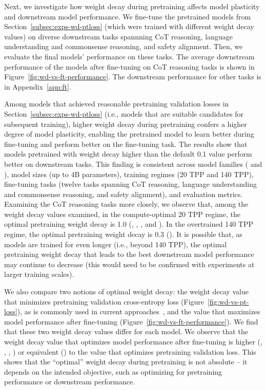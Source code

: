 Next, we investigate how weight decay during pretraining affects model plasticity and downstream model performance.
We fine-tune the pretrained models from Section~\ref{subsec:exps-wd-ptloss} (which were trained with different weight decay values) on diverse downstream tasks spannning CoT reasoning, language understanding and commonsense reasoning, and safety alignment. Then, we evaluate the final models' performance on these tasks. 
The average downstream performance of the models after fine-tuning on CoT reasoning tasks is shown in Figure~\ref{fig:wd-vs-ft-performance}.
The downstream performance for other tasks is in Appendix~\ref{app:ft}.

Among models that achieved reasonable pretraining validation losses in Section~\ref{subsec:exps-wd-ptloss} (i.e., models that are suitable candidates for subsequent training), higher weight decay during pretraining confers a higher degree of model plasticity, enabling the pretrained model to learn better during fine-tuning and perform better on the fine-tuning task.
The results show that models pretrained with weight decay higher than the default 0.1 value perform better on downstream tasks. This finding is consistent across model families (\llama{} and \olmo{}), model sizes (up to 4B parameters), training regimes (20 TPP and 140 TPP), fine-tuning tasks (twelve tasks spanning CoT reasoning, language understanding and commonsense reasoning, and safety alignment), and evaluation metrics.
Examining the CoT reasoning tasks more closely, we observe that, among the weight decay values examined, in the compute-optimal 20 TPP regime, the optimal pretraining weight decay is 1.0 (\llamazeropointfiveB{}, \llamaoneB{}, \llamafourB{}, and \olmoonex{}). In the overtrained 140 TPP regime, the optimal pretraining weight decay is 0.3 (\olmosevenx{}). It is possible that, as models are trained for even longer (i.e., beyond 140 TPP), the optimal pretraining weight decay that leads to the best downstream model performance may continue to decrease (this would need to be confirmed with experiments at larger training scales). 




We also compare two notions of optimal weight decay: the weight decay value that minimizes pretraining validation cross-entropy loss (Figure~\ref{fig:wd-vs-pt-loss}), as is commonly used in current approaches~\citep{bergsma2505powerlines}, and the value that maximizes model performance after fine-tuning (Figure~\ref{fig:wd-vs-ft-performance}). We find that these two weight decay values differ for each model. We observe that the weight decay value that optimizes model performance after fine-tuning is higher (\llamazeropointfiveB{}, \llamaoneB{}, \olmoonex{}, \olmosevenx{}) or equivalent (\llamafourB{}) to the value that optimizes pretraining validation loss. This shows that the ``optimal'' weight decay during pretraining is not absolute -- it depends on the intended objective, such as optimizing for pretraining performance or downstream performance.



